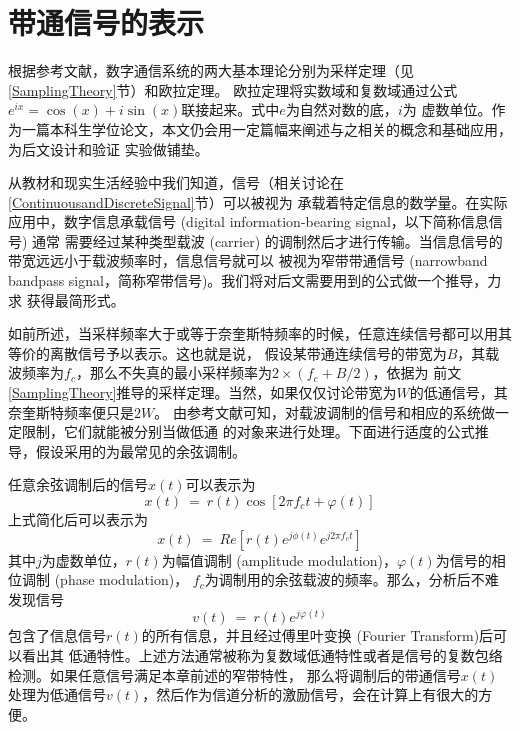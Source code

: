 \section{带通信号的表示}
根据参考文献，数字通信系统的两大基本理论分别为采样定理（见\ref{SamplingTheory}节）和欧拉定理。
欧拉定理将实数域和复数域通过公式$e^{ix} = \cos(x) + i\sin(x)$联接起来。式中$e$为自然对数的底，$i$为
虚数单位。作为一篇本科生学位论文，本文仍会用一定篇幅来阐述与之相关的概念和基础应用，为后文设计和验证
实验做铺垫。
\par
从教材和现实生活经验中我们知道，信号（相关讨论在\ref{ContinuousandDiscreteSignal}节）可以被视为
承载着特定信息的数学量。在实际应用中，数字信息承载信号 (digital information-bearing signal，以下简称信息信号) 通常
需要经过某种类型载波 (carrier) 的调制然后才进行传输。当信息信号的带宽远远小于载波频率时，信息信号就可以
被视为窄带带通信号 (narrowband bandpass signal，简称窄带信号)。我们将对后文需要用到的公式做一个推导，力求
获得最简形式。
\par
如前所述，当采样频率大于或等于奈奎斯特频率的时候，任意连续信号都可以用其等价的离散信号予以表示。这也就是说，
假设某带通连续信号的带宽为$B$，其载波频率为$f_{c}$，那么不失真的最小采样频率为$2 \times (f_{c}+B/2)$，依据为
前文\ref{SamplingTheory}推导的采样定理。当然，如果仅仅讨论带宽为$W$的低通信号，其奈奎斯特频率便只是$2W$。
由参考文献可知，对载波调制的信号和相应的系统做一定限制，它们就能被分别当做低通
的对象来进行处理。下面进行适度的公式推导，假设采用的为最常见的余弦调制。
\par
任意余弦调制后的信号$x(t)$可以表示为
\begin{equation}%
    x(t) ~=~ r(t)\cos[2\pi f_{c}t + \varphi(t)]
\end{equation}
上式简化后可以表示为
\begin{equation}%
    x(t) ~=~ Re[r(t)e^{j\phi(t)}e^{j2\pi f_{c}t}]
\end{equation}
其中$j$为虚数单位，$r(t)$为幅值调制 (amplitude modulation)，$\varphi(t)$为信号的相位调制 (phase modulation)，
$f_{c}$为调制用的余弦载波的频率。那么，分析后不难发现信号
\begin{equation}%
    v(t) ~=~ r(t)e^{j\varphi(t)}
\end{equation}
包含了信息信号$r(t)$的所有信息，并且经过傅里叶变换 (Fourier Transform)后可以看出其
低通特性。上述方法通常被称为复数域低通特性或者是信号的复数包络检测。如果任意信号满足本章前述的窄带特性，
那么将调制后的带通信号$x(t)$处理为低通信号$v(t)$，然后作为信道分析的激励信号，会在计算上有很大的方便。
